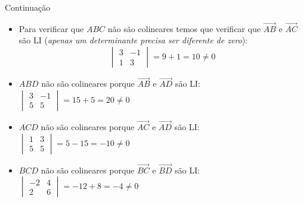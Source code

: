 \begin{frame}{Continuação}
    \begin{itemize}
        \item Para verificar que \(ABC\) não são colineares temos que verificar que \(\vec{AB}\) e
            \(\vec{AC}\) são LI (\textit{apenas um determinante precisa ser diferente de zero}):
            \[
                \begin{vmatrix}
                    3 & -1 \\ 1 & 3
                \end{vmatrix}
                = 9+1 = 10 \neq 0
            \]
        \item \(ABD\) não são colineares porque \(\vec{AB}\) e \(\vec{AD}\) são LI:
            \(
                \begin{vmatrix}
                    3 & -1 \\ 5 & 5
                \end{vmatrix}
                = 15+5 = 20 \neq 0
            \)
        \item \(ACD\) não são colineares porque \(\vec{AC}\) e \(\vec{AD}\) são LI:
            \(
                \begin{vmatrix}
                    1 & 3 \\ 5 & 5
                \end{vmatrix}
                = 5-15 = -10 \neq 0
            \)
        \item \(BCD\) não são colineares porque \(\vec{BC}\) e \(\vec{BD}\) são LI:
            \(
                \begin{vmatrix}
                    -2 & 4 \\ 2 & 6
                \end{vmatrix}
                = -12+8 = -4 \neq 0
            \)
    \end{itemize}
\end{frame}

